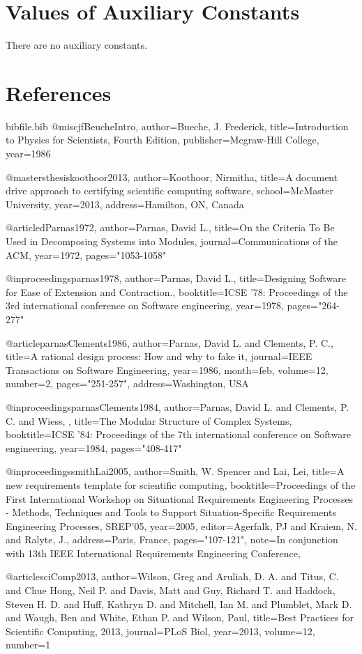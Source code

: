\documentclass[12pt]{article}
\begin{document}
\section{Values of Auxiliary Constants}
\label{Sec:AuxConstants}
There are no auxiliary constants.
\section{References}
\label{Sec:References}
\begin{filecontents*}{bibfile.bib}
@misc{jfBeucheIntro,
author={Bueche, J. Frederick},
title={Introduction to Physics for Scientists, Fourth Edition},
publisher={Mcgraw-Hill College},
year={1986}}

@mastersthesis{koothoor2013,
author={Koothoor, Nirmitha},
title={A document drive approach to certifying scientific computing software},
school={McMaster University},
year={2013},
address={Hamilton, ON, Canada}}

@article{dParnas1972,
author={Parnas, David L.},
title={On the Criteria To Be Used in Decomposing Systems into Modules},
journal={Communications of the ACM},
year={1972},
pages={"1053-1058"}}

@inproceedings{parnas1978,
author={Parnas, David L.},
title={Designing Software for Ease of Extension and Contraction.},
booktitle={ICSE '78: Proceedings of the 3rd international conference on Software engineering},
year={1978},
pages={"264-277"}}

@article{parnasClements1986,
author={Parnas, David L. and Clements, P. C.},
title={A rational design process: How and why to fake it},
journal={IEEE Transactions on Software Engineering},
year={1986},
month={feb},
volume={12},
number={2},
pages={"251-257"},
address={Washington, USA}}

@inproceedings{parnasClements1984,
author={Parnas, David L. and Clements, P. C. and Wiess, },
title={The Modular Structure of Complex Systems},
booktitle={ICSE '84: Proceedings of the 7th international conference on Software engineering},
year={1984},
pages={"408-417"}}

@inproceedings{smithLai2005,
author={Smith, W. Spencer and Lai, Lei},
title={A new requirements template for scientific computing},
booktitle={Proceedings of the First International Workshop on Situational Requirements Engineering Processes - Methods, Techniques and Tools to Support Situation-Specific Requirements Engineering Processes, SREP'05},
year={2005},
editor={Agerfalk, PJ and Kraiem, N. and Ralyte, J.},
address={Paris, France},
pages={"107-121"},
note={In conjunction with 13th IEEE International Requirements Engineering Conference,}}

@article{sciComp2013,
author={Wilson, Greg and Aruliah, D. A. and Titus, C. and Chue Hong, Neil P. and Davis, Matt and Guy, Richard T. and Haddock, Steven H. D. and Huff, Kathryn D. and Mitchell, Ian M. and Plumblet, Mark D. and Waugh, Ben and White, Ethan P. and Wilson, Paul},
title={Best Practices for Scientific Computing, 2013},
journal={PLoS Biol},
year={2013},
volume={12},
number={1}}
\end{filecontents*}
\nocite{*}
\printbibliography[heading=none]
\end{document}
